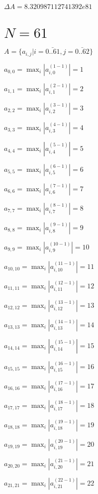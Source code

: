 \documentclass[a4paper,12pt]{article}
\begin{document}
$\Delta A = 8.320987112741392e81$



\section{ $N = 61$ }
$A = \{ a _{ i, j } | i = \bar { 0..61 }, j = \bar { 0..62 } \}$

$a _{ 0, 0 } =  \max _i |a _{ i, 0 } ^{ (1 - 1) } | = 1$

$a _{ 1, 1 } =  \max _i |a _{ i, 1 } ^{ (2 - 1) } | = 2$

$a _{ 2, 2 } =  \max _i |a _{ i, 2 } ^{ (3 - 1) } | = 3$

$a _{ 3, 3 } =  \max _i |a _{ i, 3 } ^{ (4 - 1) } | = 4$

$a _{ 4, 4 } =  \max _i |a _{ i, 4 } ^{ (5 - 1) } | = 5$

$a _{ 5, 5 } =  \max _i |a _{ i, 5 } ^{ (6 - 1) } | = 6$

$a _{ 6, 6 } =  \max _i |a _{ i, 6 } ^{ (7 - 1) } | = 7$

$a _{ 7, 7 } =  \max _i |a _{ i, 7 } ^{ (8 - 1) } | = 8$

$a _{ 8, 8 } =  \max _i |a _{ i, 8 } ^{ (9 - 1) } | = 9$

$a _{ 9, 9 } =  \max _i |a _{ i, 9 } ^{ (10 - 1) } | = 10$

$a _{ 10, 10 } =  \max _i |a _{ i, 10 } ^{ (11 - 1) } | = 11$

$a _{ 11, 11 } =  \max _i |a _{ i, 11 } ^{ (12 - 1) } | = 12$

$a _{ 12, 12 } =  \max _i |a _{ i, 12 } ^{ (13 - 1) } | = 13$

$a _{ 13, 13 } =  \max _i |a _{ i, 13 } ^{ (14 - 1) } | = 14$

$a _{ 14, 14 } =  \max _i |a _{ i, 14 } ^{ (15 - 1) } | = 15$

$a _{ 15, 15 } =  \max _i |a _{ i, 15 } ^{ (16 - 1) } | = 16$

$a _{ 16, 16 } =  \max _i |a _{ i, 16 } ^{ (17 - 1) } | = 17$

$a _{ 17, 17 } =  \max _i |a _{ i, 17 } ^{ (18 - 1) } | = 18$

$a _{ 18, 18 } =  \max _i |a _{ i, 18 } ^{ (19 - 1) } | = 19$

$a _{ 19, 19 } =  \max _i |a _{ i, 19 } ^{ (20 - 1) } | = 20$

$a _{ 20, 20 } =  \max _i |a _{ i, 20 } ^{ (21 - 1) } | = 21$

$a _{ 21, 21 } =  \max _i |a _{ i, 21 } ^{ (22 - 1) } | = 22$
\end{document}
